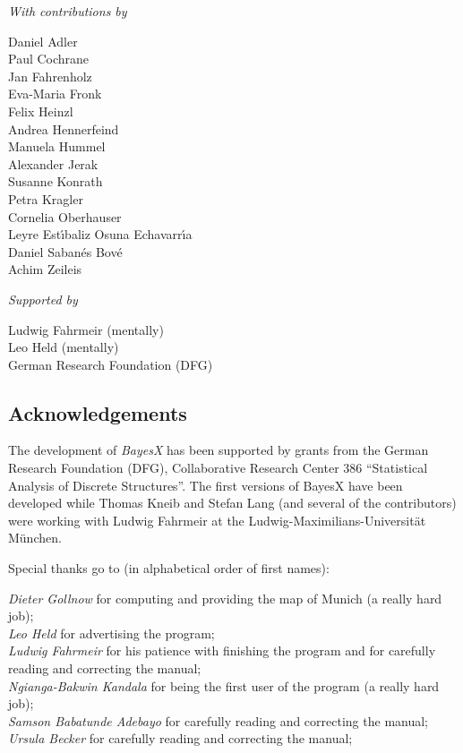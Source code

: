 {\vspace{2ex}

{\em With contributions by}

\vspace{-1.5ex}

\begin{multicols}{2}
Daniel Adler\\
Paul Cochrane\\
Jan Fahrenholz\\
Eva-Maria Fronk\\
Felix Heinzl\\
Andrea Hennerfeind\\
Manuela Hummel\\
Alexander Jerak\\
Susanne Konrath\\
Petra Kragler\\
Cornelia Oberhauser\\
Leyre Est\'{\i}baliz Osuna Echavarr\'{\i}a\\
Daniel Saban\'{e}s Bov\'{e} \\
Achim Zeileis
\end{multicols}

{\em Supported by}

Ludwig Fahrmeir (mentally)\\
Leo Held (mentally)\\
German Research Foundation (DFG)

\newpage

\subsection*{Acknowledgements}

The development of {\em BayesX} has been supported by grants from the German Research Foundation (DFG), Collaborative
Research Center 386 ``Statistical Analysis of Discrete Structures''. The first versions of BayesX have been developed while Thomas Kneib and Stefan Lang (and several of the contributors) were working with Ludwig Fahrmeir at the Ludwig-Maximilians-Universit\"{a}t M\"{u}nchen.

Special thanks go to (in alphabetical order of first names):

{\em Dieter Gollnow} for computing and providing the map of Munich (a really hard job); \\
{\em Leo Held} for advertising the program; \\
{\em Ludwig Fahrmeir} for his patience with finishing the program and for carefully
reading and correcting the  manual; \\
{\em Ngianga-Bakwin Kandala} for being the first user of the program (a really hard job); \\
{\em Samson Babatunde Adebayo} for carefully reading and correcting the manual; \\
{\em Ursula Becker} for carefully reading and correcting the manual;

}
